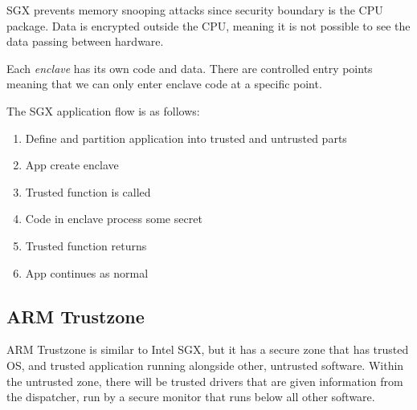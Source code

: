 \documentclass[11pt,a4paper,titlepage,dvipsnames,cmyk]{scrartcl}
\begin{document}
SGX prevents memory snooping attacks since security boundary is the CPU package. Data is encrypted outside the CPU, meaning it is not possible to see the data passing between hardware.

Each \textit{enclave} has its own code and data. There are controlled entry points meaning that we can only enter enclave code at a specific point.

The SGX application flow is as follows:
\begin{enumerate}
\item Define and partition application into trusted and untrusted parts
\item App create enclave
\item Trusted function is called
\item Code in enclave process some secret
\item Trusted function returns
\item App continues as normal
\end{enumerate}

\subsection{ARM Trustzone}
ARM Trustzone is similar to Intel SGX, but it has a secure zone that has trusted OS, and trusted application running alongside other, untrusted software. Within the untrusted zone, there will be trusted drivers that are given information from the dispatcher, run by a secure monitor that runs below all other software.
\end{document}
